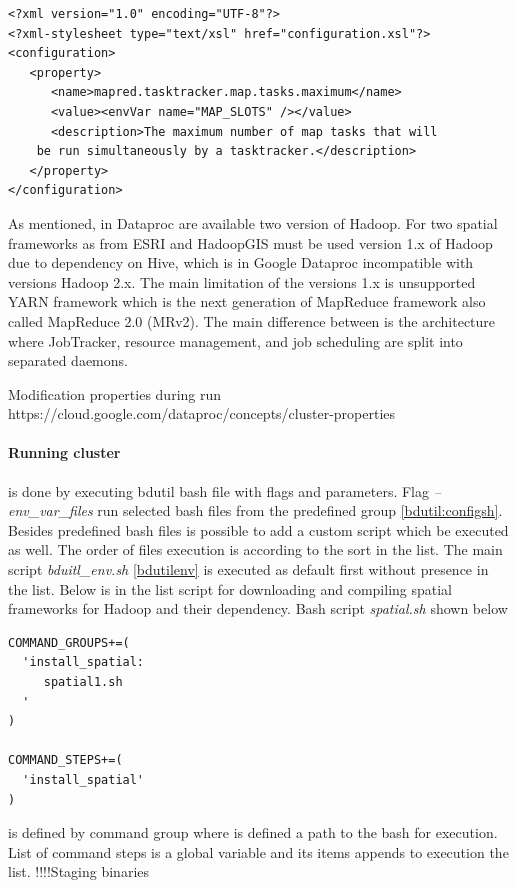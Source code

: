 \documentclass[a4paper,12pt,oneside]{report}
\begin{document}
\begin{footnotesize}
\begin{lstlisting}[style=XML]
<?xml version="1.0" encoding="UTF-8"?>
<?xml-stylesheet type="text/xsl" href="configuration.xsl"?>
<configuration>
   <property>
      <name>mapred.tasktracker.map.tasks.maximum</name>
      <value><envVar name="MAP_SLOTS" /></value>
      <description>The maximum number of map tasks that will 
    be run simultaneously by a tasktracker.</description>
   </property>
</configuration>
\end{lstlisting}
\end{footnotesize}


 
As mentioned, in Dataproc are available two version of Hadoop. For two spatial frameworks as from 
ESRI and HadoopGIS must be used version 1.x of Hadoop due to dependency on Hive, which is in Google 
Dataproc incompatible with versions Hadoop 2.x. The main limitation of the versions 1.x is unsupported 
YARN framework which is the next generation of MapReduce framework also called MapReduce 2.0 (MRv2)\cite{yarn}. 
The main difference between is the architecture where JobTracker, resource management, and job scheduling are split into separated daemons.


Modification properties during run https://cloud.google.com/dataproc/concepts/cluster-properties
	

\paragraph{Running cluster} is done by executing bdutil bash file with flags and parameters.  
Flag \textit{--env\_var\_files} run selected bash files from the predefined group \ref{bdutil:configsh}. 
Besides predefined bash files is possible to add a custom script which be executed as well. The  order 
of files execution is according to the sort in the list. The main script \textit{bduitl\_env.sh} 
\ref{bdutilenv} is executed as default first without presence in the list. Below is in the list script 
for downloading and compiling spatial frameworks for Hadoop and their dependency. Bash script \textit{spatial.sh} shown below 
%
\begin{footnotesize}
\begin{lstlisting}[style=python]
COMMAND_GROUPS+=(
  'install_spatial:
     spatial1.sh
  '
)

COMMAND_STEPS+=(
  'install_spatial'
)
\end{lstlisting}
\end{footnotesize}
is defined by command group where is defined a path to the bash for execution. List of command steps is a
 global variable and its items appends to execution the list.
 !!!!Staging binaries
 
\end{document}
